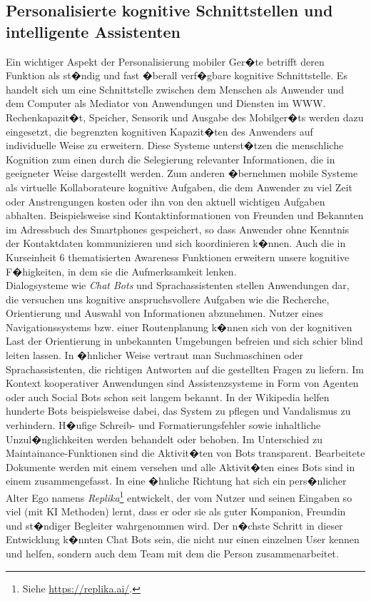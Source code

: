 \subsection{Personalisierte kognitive Schnittstellen und intelligente Assistenten}
Ein wichtiger Aspekt der Personalisierung mobiler Ger�te betrifft deren Funktion als st�ndig und fast �berall verf�gbare kognitive Schnittstelle. Es handelt sich um eine Schnittstelle zwischen dem Menschen als Anwender und dem Computer als Mediator von Anwendungen und Diensten im WWW. Rechenkapazit�t, Speicher, Sensorik und Ausgabe des Mobilger�ts werden dazu eingesetzt, die begrenzten kognitiven Kapazit�ten des Anwenders auf individuelle Weise zu erweitern. Diese Systeme unterst�tzen die menschliche Kognition zum einen durch die Selegierung relevanter Informationen, die in geeigneter Weise dargestellt werden. Zum anderen �bernehmen mobile Systeme als virtuelle Kollaborateure kognitive Aufgaben, die dem Anwender zu viel Zeit oder Anstrengungen kosten oder ihn von den aktuell wichtigen Aufgaben abhalten.
Beispielsweise sind  Kontaktinformationen von Freunden und Bekannten im Adressbuch des Smartphones gespeichert, so dass Anwender ohne Kenntnis der Kontaktdaten kommunizieren und sich koordinieren k�nnen. Auch die in Kurseinheit 6 thematisierten Awareness Funktionen erweitern unsere kognitive F�higkeiten, in dem sie die Aufmerksamkeit lenken.\\ 
Dialogsysteme wie \textit{Chat Bots} und Sprachassistenten stellen Anwendungen dar, die versuchen uns kognitive anspruchsvollere Aufgaben wie die Recherche, Orientierung und Auswahl von Informationen abzunehmen. Nutzer eines Navigationssystems bzw. einer Routenplanung k�nnen sich von der kognitiven Last der Orientierung in unbekannten Umgebungen befreien und sich schier blind leiten lassen. In �hnlicher Weise vertraut man Suchmaschinen oder Sprachassistenten, die richtigen Antworten auf die gestellten Fragen zu liefern. Im Kontext kooperativer Anwendungen sind Assistenzsysteme in Form von Agenten oder auch Social Bots schon seit langem bekannt. In der Wikipedia helfen hunderte Bots beispielsweise dabei, das System zu pflegen und Vandalismus zu verhindern. H�ufige Schreib- und Formatierungsfehler sowie inhaltliche Unzul�nglichkeiten werden behandelt oder behoben. Im Unterschied zu Maintainance-Funktionen sind die Aktivit�ten von Bots transparent. Bearbeitete Dokumente werden mit einem  versehen und alle Aktivit�ten eines Bots sind in einem  zusammengefasst. In eine �hnliche Richtung hat sich ein pers�nlicher Alter Ego namens \textit{Replika}\footnote{Siehe \url{https://replika.ai/}.} entwickelt, der vom Nutzer und seinen Eingaben so viel (mit KI Methoden) lernt, dass er oder sie als guter Kompanion, Freundin und st�ndiger Begleiter wahrgenommen wird. Der n�chste Schritt in dieser Entwicklung k�nnten Chat Bots sein, die nicht nur einen einzelnen User kennen und helfen, sondern auch dem Team mit dem die Person zusammenarbeitet.

